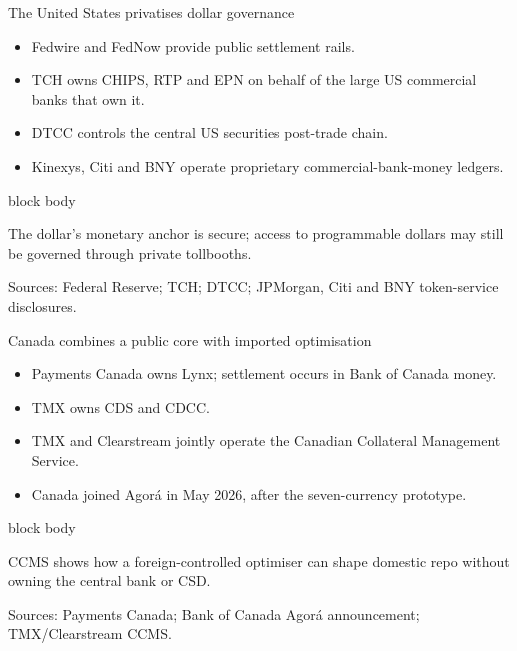 \documentclass[aspectratio=169,12pt]{beamer}
\newcommand{\source}[1]{\vfill\par\fontsize{5.4}{6.5}\selectfont\color{Quiet}Sources: #1}
\newcommand{\tightitems}{\setlength{\itemsep}{0.42em}\setlength{\parskip}{0pt}}
\newenvironment{statement}{%
  \begin{beamercolorbox}[sep=.18cm,rounded=false,wd=\linewidth]{block body}%
  \fontsize{13}{15.5}\selectfont\bfseries
}{\end{beamercolorbox}}
\begin{document}
\begin{frame}{The United States privatises dollar governance}
  \begin{itemize}\tightitems
    \item Fedwire and FedNow provide public settlement rails.
    \item TCH owns CHIPS, RTP and EPN on behalf of the large US commercial banks that own it.
    \item DTCC controls the central US securities post-trade chain.
    \item Kinexys, Citi and BNY operate proprietary commercial-bank-money ledgers.
  \end{itemize}
  \begin{statement}
    The dollar's monetary anchor is secure; access to programmable dollars may still be governed through private tollbooths.
  \end{statement}
  \source{Federal Reserve; TCH; DTCC; JPMorgan, Citi and BNY token-service disclosures.}
\end{frame}

\begin{frame}{Canada combines a public core with imported optimisation}
  \begin{itemize}\tightitems
    \item Payments Canada owns Lynx; settlement occurs in Bank of Canada money.
    \item TMX owns CDS and CDCC.
    \item TMX and Clearstream jointly operate the Canadian Collateral Management Service.
    \item Canada joined Agor\'a in May 2026, after the seven-currency prototype.
  \end{itemize}
  \begin{statement}
    CCMS shows how a foreign-controlled optimiser can shape domestic repo without owning the central bank or CSD.
  \end{statement}
  \source{Payments Canada; Bank of Canada Agor\'a announcement; TMX/Clearstream CCMS.}
\end{frame}
\end{document}
